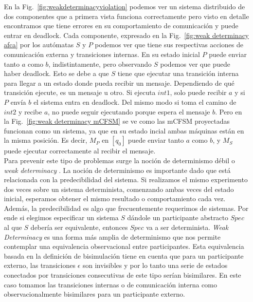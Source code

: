 En la Fig.~\ref{fig:weakdeterminacyviolation} podemos ver un sistema distribuido de dos componentes que a primera vista funciona correctamente pero visto en detalle encontramos que tiene errores en su comportamiento de comunicación y puede entrar en deadlock. Cada componente, expresado en la Fig.~\ref{fig:weak determinacy afca} por los autómatas $S$ y $P$ podemos ver que tiene sus respectivas acciones de comunicación externa y transiciones internas. En su estado inicial $P$ puede enviar tanto $a$ como $b$, indistintamente, pero observando $S$ podemos ver que puede haber deadlock. Esto se debe a que $S$ tiene que ejecutar una transición interna para llegar a un estado donde pueda recibir un mensaje. Dependiendo de qué transición ejecute, es un mensaje u otro. Si ejecuta $int1$, solo puede recibir $a$ y si $P$ envía $b$ el sistema entra en deadlock. Del mismo modo si toma el camino de $int2$ y recibe $a$, no puede seguir ejecutando porque espera el mensaje $b$. Pero en la Fig.~\ref{fig:weak determinacy mCFSM} se ve como las mCFSM proyectadas funcionan como un sistema, ya que en su estado incial ambas máquinas están en la misma posición. Es decir, $M_P$ en $[q_0]$ puede enviar tanto $a$ como $b$, y $M_S$ puede ejecutar correctamente al recibir el mensaje.\\

Para prevenir este tipo de problemas surge la noción de determinismo débil o \emph{weak determinacy} \cite[Chap.~11, Def.~3]{milner89}. La noción de determinismo es importante dado que está relacionada con la predecibilidad del sistema. Si realizamos el mismo experimento dos veces sobre un sistema determinista, comenzando ambas veces del estado inicial, esperamos obtener el mismo resultado o comportamiento cada vez. Además, la predecibilidad es algo que frecuentemente requerimos de sistemas. Por ende si elegimos especificar un sistema $S$ dándole un participante abstracto $Spec$ al que $S$ debería ser equivalente, entonces $Spec$ va a ser determinista. \emph{Weak Determinacy} es una forma más amplia de determinismo que nos permite contemplar una equivalencia observacional entre participantes. Esta equivalencia basada en la definición de bisimulación tiene en cuenta que para un participante externo, las transiciones $\epsilon$ son invisibles y por lo tanto una serie de estados conectados por transiciones consecutivas de este tipo serían bisimilares. En este caso tomamos las transiciones internas o de comunicación interna como observacionalmente bisimilares para un participante externo.  

